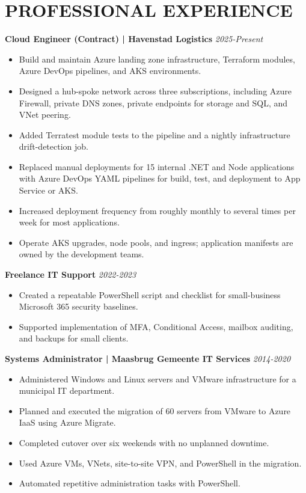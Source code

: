 \documentclass[11pt,a4paper]{article}
\begin{document}
\section*{PROFESSIONAL EXPERIENCE}
\textbf{Cloud Engineer (Contract) | Havenstad Logistics} \hfill \textit{2025-Present}
\begin{itemize}
\item Build and maintain Azure landing zone infrastructure, Terraform modules, Azure DevOps pipelines, and AKS environments.
\item Designed a hub-spoke network across three subscriptions, including Azure Firewall, private DNS zones, private endpoints for storage and SQL, and VNet peering.
\item Added Terratest module tests to the pipeline and a nightly infrastructure drift-detection job.
\item Replaced manual deployments for 15 internal .NET and Node applications with Azure DevOps YAML pipelines for build, test, and deployment to App Service or AKS.
\item Increased deployment frequency from roughly monthly to several times per week for most applications.
\item Operate AKS upgrades, node pools, and ingress; application manifests are owned by the development teams.
\end{itemize}

\textbf{Freelance IT Support} \hfill \textit{2022-2023}
\begin{itemize}
\item Created a repeatable PowerShell script and checklist for small-business Microsoft 365 security baselines.
\item Supported implementation of MFA, Conditional Access, mailbox auditing, and backups for small clients.
\end{itemize}

\textbf{Systems Administrator | Maasbrug Gemeente IT Services} \hfill \textit{2014-2020}
\begin{itemize}
\item Administered Windows and Linux servers and VMware infrastructure for a municipal IT department.
\item Planned and executed the migration of 60 servers from VMware to Azure IaaS using Azure Migrate.
\item Completed cutover over six weekends with no unplanned downtime.
\item Used Azure VMs, VNets, site-to-site VPN, and PowerShell in the migration.
\item Automated repetitive administration tasks with PowerShell.
\end{itemize}
\end{document}
